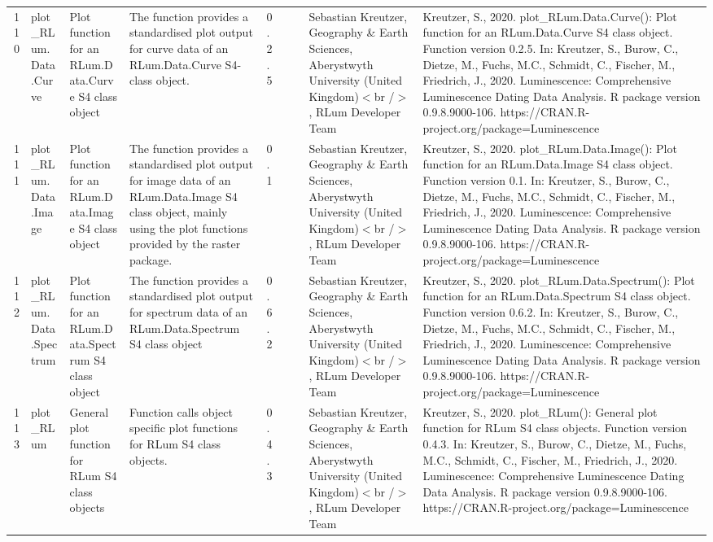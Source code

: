 \begin{table}[ht]
\begin{tabular}{rllllllll}
 \\ 
  110 & plot\_RLum.Data.Curve & Plot function for an RLum.Data.Curve S4 class object & The function provides a standardised plot output for curve data of an RLum.Data.Curve  S4-class object. & 0.2.5
 &  &  & Sebastian Kreutzer, Geography \& Earth Sciences, Aberystwyth University (United Kingdom)$<$br /$>$ , RLum Developer Team & Kreutzer, S., 2020. plot\_RLum.Data.Curve(): Plot function for an RLum.Data.Curve S4 class object. Function version 0.2.5. In: Kreutzer, S., Burow, C., Dietze, M., Fuchs, M.C., Schmidt, C., Fischer, M., Friedrich, J., 2020. Luminescence: Comprehensive Luminescence Dating Data Analysis. R package version 0.9.8.9000-106. https://CRAN.R-project.org/package=Luminescence
 \\ 
  111 & plot\_RLum.Data.Image & Plot function for an  RLum.Data.Image  S4 class object & The function provides a standardised plot output for image data of an RLum.Data.Image S4 class object, mainly using the plot functions provided by the  raster  package. & 0.1
 &  &  & Sebastian Kreutzer, Geography \& Earth Sciences, Aberystwyth University (United Kingdom)$<$br /$>$ , RLum Developer Team & Kreutzer, S., 2020. plot\_RLum.Data.Image(): Plot function for an RLum.Data.Image S4 class object. Function version 0.1. In: Kreutzer, S., Burow, C., Dietze, M., Fuchs, M.C., Schmidt, C., Fischer, M., Friedrich, J., 2020. Luminescence: Comprehensive Luminescence Dating Data Analysis. R package version 0.9.8.9000-106. https://CRAN.R-project.org/package=Luminescence
 \\ 
  112 & plot\_RLum.Data.Spectrum & Plot function for an RLum.Data.Spectrum S4 class object & The function provides a standardised plot output for spectrum data of an RLum.Data.Spectrum S4 class object & 0.6.2
 &  &  & Sebastian Kreutzer, Geography \& Earth Sciences, Aberystwyth University (United Kingdom)$<$br /$>$ , RLum Developer Team & Kreutzer, S., 2020. plot\_RLum.Data.Spectrum(): Plot function for an RLum.Data.Spectrum S4 class object. Function version 0.6.2. In: Kreutzer, S., Burow, C., Dietze, M., Fuchs, M.C., Schmidt, C., Fischer, M., Friedrich, J., 2020. Luminescence: Comprehensive Luminescence Dating Data Analysis. R package version 0.9.8.9000-106. https://CRAN.R-project.org/package=Luminescence
 \\ 
  113 & plot\_RLum & General plot function for RLum S4 class objects & Function calls object specific plot functions for RLum S4 class objects. & 0.4.3
 &  &  & Sebastian Kreutzer, Geography \& Earth Sciences, Aberystwyth University (United Kingdom)$<$br /$>$ , RLum Developer Team & Kreutzer, S., 2020. plot\_RLum(): General plot function for RLum S4 class objects. Function version 0.4.3. In: Kreutzer, S., Burow, C., Dietze, M., Fuchs, M.C., Schmidt, C., Fischer, M., Friedrich, J., 2020. Luminescence: Comprehensive Luminescence Dating Data Analysis. R package version 0.9.8.9000-106. https://CRAN.R-project.org/package=Luminescence

\end{tabular}
\end{table}
